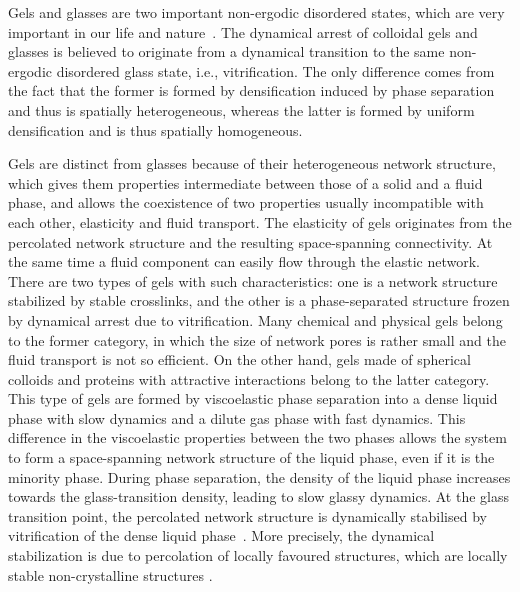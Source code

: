 \documentclass[a4paper,preprint,superscriptaddress]{revtex4}
\begin{document}
\maketitle
Gels and glasses are two important non-ergodic disordered states, which are very important 
in our life and nature~\cite{anderson2002insights,lekkerkerker2011colloids}.
The dynamical arrest of colloidal gels and glasses is believed to originate from a dynamical transition to the same non-ergodic disordered glass state, i.e., vitrification. The only difference comes from the fact that the former is formed by densification induced by phase separation and thus is spatially heterogeneous, whereas the latter is formed by uniform densification and is thus spatially homogeneous.

Gels are distinct from glasses because of their heterogeneous network structure, which gives them properties intermediate between
those of a solid and a fluid phase, and allows the coexistence of two properties usually incompatible with each other, 
elasticity and fluid transport. 
The elasticity of gels originates from the percolated network structure and the resulting space-spanning connectivity. 
At the same time a fluid component can easily flow through the elastic network.
There are two types of gels with such characteristics: one is a network structure stabilized by stable crosslinks, and the other is a phase-separated structure frozen by dynamical arrest due to vitrification.
Many chemical and physical gels belong to the former category, in which the size of network pores is rather small and 
the fluid transport is not so efficient. On the other hand, gels made of spherical colloids and proteins 
with attractive interactions belong to the latter category. 
This type of gels are formed by viscoelastic phase separation \cite{tanaka1999colloid,tanaka2000viscoelastic} into a dense liquid phase with slow dynamics and a dilute gas phase 
with fast dynamics. This difference in the viscoelastic properties between the two phases allows the system to form a space-spanning 
network structure of the liquid phase, even if it is the minority phase. During phase separation, the density of the liquid phase 
increases towards the glass-transition density, leading to slow glassy dynamics.
At the glass transition point, the percolated network structure is dynamically stabilised by vitrification 
of the dense liquid phase~\cite{pusey1993dynamics,ilett1995phase,verhaegh1997transient,tanaka1999colloid,foffi2002,zaccarelli2007,lu2008gelation,zaccarelli2008gelation,testard2011}.  
More precisely, the dynamical stabilization is due to percolation of locally favoured structures, which are locally stable non-crystalline structures \cite{royall2008g}.
\end{document}
